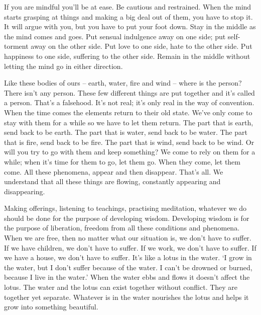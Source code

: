 If you are mindful you'll be at ease. Be cautious and restrained. When the mind starts grasping at things and making a big deal out of them, you have to stop it. It will argue with you, but you have to put your foot down. Stay in the middle as the mind comes and goes. Put sensual indulgence away on one side; put self-torment away on the other side. Put love to one side, hate to the other side. Put happiness to one side, suffering to the other side. Remain in the middle without letting the mind go in either direction. 

Like these bodies of ours -- earth, water, fire and wind -- where is the person? There isn't any person. These few different things are put together and it's called a person. That's a falsehood. It's not real; it's only real in the way of convention. When the time comes the elements return to their old state. We've only come to stay with them for a while so we have to let them return. The part that is earth, send back to be earth. The part that is water, send back to be water. The part that is fire, send back to be fire. The part that is wind, send back to be wind. Or will you try to go with them and keep something? We come to rely on them for a while; when it's time for them to go, let them go. When they come, let them come. All these phenomena,  appear and then disappear. That's all. We understand that all these things are flowing, constantly appearing and disappearing. 

Making offerings, listening to teachings, practising meditation, whatever we do should be done for the purpose of developing wisdom. Developing wisdom is for the purpose of liberation, freedom from all these conditions and phenomena. When we are free, then no matter what our situation is, we don't have to suffer. If we have children, we don't have to suffer. If we work, we don't have to suffer. If we have a house, we don't have to suffer. It's like a lotus in the water. `I grow in the water, but I don't suffer because of the water. I can't be drowned or burned, because I live in the water.' When the water ebbs and flows it doesn't affect the lotus. The water and the lotus can exist together without conflict. They are together yet separate. Whatever is in the water nourishes the lotus and helps it grow into something beautiful. 

